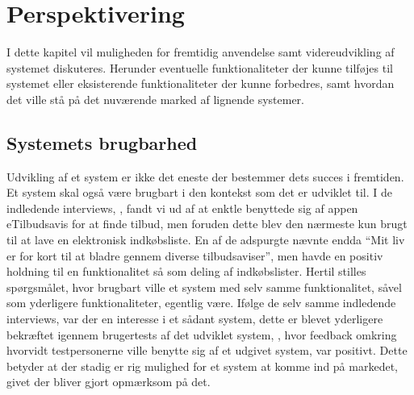 \chapter{Perspektivering}
I dette kapitel vil muligheden for fremtidig anvendelse samt videreudvikling af systemet diskuteres.
Herunder eventuelle funktionaliteter der kunne tilføjes til systemet eller eksisterende funktionaliteter der kunne forbedres, samt hvordan det ville stå på det nuværende marked af lignende systemer.

\section{Systemets brugbarhed}
Udvikling af et system er ikke det eneste der bestemmer dets succes i fremtiden.
Et system skal også være brugbart i den kontekst som det er udviklet til.
I de indledende interviews, , fandt vi ud af at enktle benyttede sig af appen eTilbudsavis for at finde tilbud, men foruden dette blev den nærmeste kun brugt til at lave en elektronisk indkøbsliste.
En af de adspurgte nævnte endda ``Mit liv er for kort til at bladre gennem diverse tilbudsaviser'', men havde en positiv holdning til en funktionalitet så som deling af indkøbslister.
Hertil stilles spørgsmålet, hvor brugbart ville et system med selv samme funktionalitet, såvel som yderligere funktionaliteter, egentlig være.
Ifølge de selv samme indledende interviews, var der en interesse i et sådant system, dette er blevet yderligere bekræftet igennem brugertests af det udviklet system, , hvor feedback omkring hvorvidt testpersonerne ville benytte sig af et udgivet system, var positivt.
Dette betyder at der stadig er rig mulighed for et system at komme ind på markedet, givet der bliver gjort opmærksom på det.

